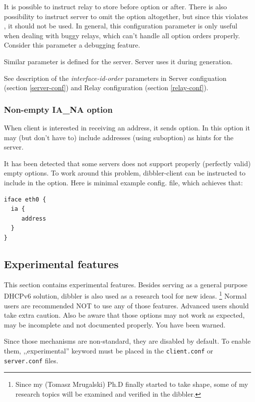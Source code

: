 It is possible to instruct relay to store  before
 option or after. There is also possibility to instruct
server to omit the  option altogether, but since 
this violates \cite{rfc3315}, it should not be used. In general, this
configuration parameter is only useful when dealing with buggy relays,
which can't handle all option orders properly. Consider this parameter
a debugging feature.

Similar parameter is defined for the server. Server uses it during
 generation. 

See description of the \emph{interface-id-order} parameters in Server
configuation (section \ref{server-conf}) and Relay configuration
(section \ref{relay-conf}).

\subsubsection{Non-empty IA\_NA option}
When client is interested in receiving an address, it sends
 option. In this option it may (but don't have to) include
addresses (using  suboption) as hints for the server.

It has been detected that some servers does not support properly
(perfectly valid) empty  options. To work around this
problem, dibbler-client can be instructed to include  in
the  option. Here is minimal example config. file, which
achieves that:

\begin{lstlisting}
iface eth0 {
  ia {
     address
  } 
}
\end{lstlisting}

\subsection{Experimental features}

This section contains experimental features. Besides serving as a
general purpose DHCPv6 solution, dibbler is also used as a research
tool for new ideas. \footnote{Since my (Tomasz Mrugalski) Ph.D finally
started to take shape, some of my research topics will be examined and
verified in the dibbler.} Normal users are recommended NOT to use any
of those features. Advanced users should take extra caution. Also be
aware that those options may not work as expected, may be incomplete
and not documented properly. You have been warned.

Since those mechanisms are non-standard, they are disabled by
default. To enable them, ,,experimental'' keyword must be placed in
the \verb+client.conf+ or \verb+server.conf+ files.

